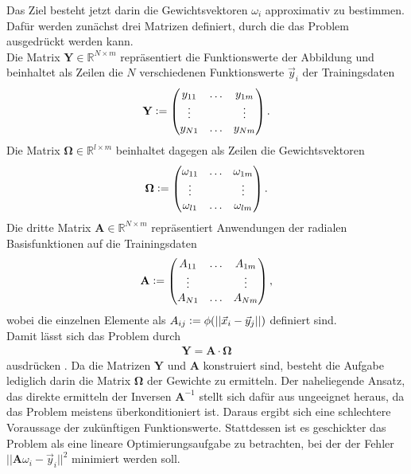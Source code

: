 Das Ziel besteht jetzt darin die Gewichtsvektoren $\omega_i$ approximativ zu bestimmen. Dafür werden zunächst drei Matrizen definiert, durch die das Problem ausgedrückt werden kann.\\
Die Matrix $\mathbf{Y} \in \mathbb{R}^{N \times m}$ repräsentiert die Funktionswerte der Abbildung und beinhaltet als Zeilen die $N$ verschiedenen Funktionswerte $\vec{y}_i$ der Trainingsdaten
\begin{align}
\mathbf{Y} \vcentcolon=
\begin{pmatrix}
y_{11} & \ldots  & y_{1m} \\
\vdots & & \vdots \\
y_{N1} & \ldots  & y_{Nm} \\
\end{pmatrix}.
\end{align}
Die Matrix $\mathbf{\Omega} \in \mathbb{R}^{l \times m}$ beinhaltet dagegen als Zeilen die Gewichtsvektoren
\begin{align}
\mathbf{\Omega} \vcentcolon=
\begin{pmatrix}
\omega_{11} & \ldots  & \omega_{1m} \\
\vdots & & \vdots \\
\omega_{l1} & \ldots  & \omega_{lm} \\
\end{pmatrix}.
\end{align}
Die dritte Matrix $\mathbf{A} \in \mathbb{R}^{N \times m}$ repräsentiert Anwendungen der radialen Basisfunktionen auf die Trainingsdaten 
\begin{align}
\mathbf{A} \vcentcolon=
\begin{pmatrix}
A_{11} & \ldots  & A_{1m} \\
\vdots & & \vdots \\
A_{N1} & \ldots  & A_{Nm} \\
\end{pmatrix},
\end{align}
wobei die einzelnen Elemente als $A_{ij} \vcentcolon= \phi(|| \vec{x}_i - \vec{y}_j ||)$ definiert sind.\\
Damit lässt sich das Problem durch
\begin{align}
\mathbf{Y} = \mathbf{A} \cdot \mathbf{\Omega}
\end{align}
ausdrücken \citep{lowe2multi}. Da die Matrizen $\mathbf{Y}$ und $\mathbf{A}$ konstruiert sind, besteht die Aufgabe lediglich darin die Matrix $\mathbf{\Omega}$ der Gewichte zu ermitteln. Der naheliegende Ansatz, das direkte ermitteln der Inversen $\mathbf{A}^{-1}$ stellt sich dafür aus ungeeignet heraus, da das Problem meistens überkonditioniert ist. Daraus ergibt sich eine schlechtere Voraussage der zukünftigen Funktionswerte. Stattdessen ist es geschickter das Problem als eine lineare Optimierungsaufgabe zu betrachten, bei der der Fehler $||\mathbf{A} \omega_i - \vec{y}_i||^2$ minimiert werden soll.\\
